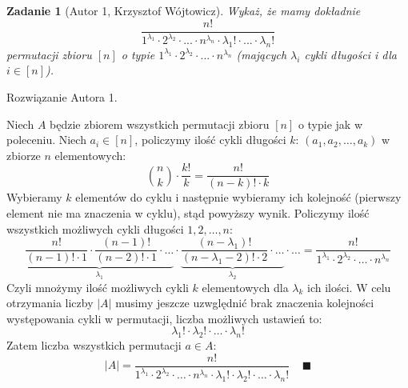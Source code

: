\documentclass{mwart}
\newtheorem{zad}{Zadanie}[section]
\begin{document}
\begin{zad}[Autor 1, Krzysztof Wójtowicz]
    Wykaż, że mamy dokładnie
    \[\frac{n!}{1^{\lambda_1} \cdot 2^{\lambda_2} \cdot  ... \cdot n^{\lambda_n} \cdot \lambda_1! \cdot ... \cdot \lambda_n!}\]
    permutacji zbioru $[n]$ o typie $1^{\lambda_1} \cdot 2^{\lambda_2} \cdot ... \cdot n^{\lambda_n} $  (mających $\lambda_i$ cykli długości i dla $i \in [n]$).
\end{zad}
\begin{mdframed}
    Rozwiązanie Autora 1.
\end{mdframed}
\begin{mdframed}
    Niech $A$ będzie zbiorem wszystkich permutacji zbioru $[n]$ o typie jak w poleceniu.
    Niech $a_i \in [n]$, policzymy ilość cykli długości $k$: $(a_1,a_2,\ldots,a_k)$ w zbiorze $n$ elementowych:
    \[\binom{n}{k} \cdot \frac{k!}{k} = \frac{n!}{(n-k)! \cdot k}\]
    Wybieramy $k$ elementów do cyklu i następnie wybieramy ich kolejność (pierwszy element 
    nie ma znaczenia w cyklu), stąd powyższy wynik.
    \newline \newline
    Policzymy ilość wszystkich możliwych cykli długości $1,2,\ldots,n$:
    \[\underbrace{\frac{n!}{(n-1)! \cdot 1} \cdot \frac{(n-1)!}{(n-2)! \cdot 1} \cdot \ldots}_{\lambda_1} \cdot 
    \underbrace{\frac{(n-\lambda_1)!}{(n-\lambda_1-2)! \cdot 2} \cdot \ldots}_{\lambda_2} \cdot \ldots = 
    \frac{n!}{1^{\lambda_1} \cdot 2^{\lambda_2} \cdot \ldots \cdot n^{\lambda_n}} \]
    Czyli mnożymy ilość możliwych cykli $k$ elementowych dla $\lambda_k$ ich ilości.
    \newline \newline
    W celu otrzymania liczby $|A|$ musimy jeszcze uzwględnić brak znaczenia kolejności
    występowania cykli w permutacji, liczba możliwych ustawień to:
    \[{\lambda_1}! \cdot {\lambda_2}! \cdot \ldots \cdot {\lambda_n}!\]
    Zatem liczba wszystkich permutacji $a \in A$:
    \[|A| = \frac{n!}{1^{\lambda_1} \cdot 2^{\lambda_2} \cdot \ldots \cdot n^{\lambda_n}
    \cdot {\lambda_1}! \cdot {\lambda_2}! \cdot \ldots \cdot {\lambda_n}!} \; \; \; \; \blacksquare\]
\end{mdframed}
\end{document}

